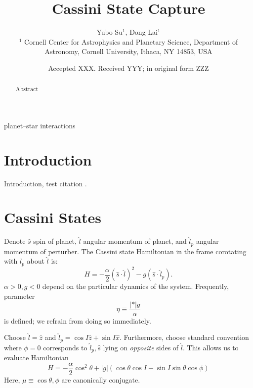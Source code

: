 \documentclass[
        fleqn,
        usenatbib,
    ]{mnras}
\title[Cassini State Capture]{Cassini State Capture}
\author[Y. Su et\ al.]{
Yubo Su$^1$,
Dong Lai$^1$
\\
$^1$ Cornell Center for Astrophysics and Planetary Science, Department of
Astronomy, Cornell University, Ithaca, NY 14853, USA
}
\date{Accepted XXX\@. Received YYY\@; in original form ZZZ}
\newcommand*{\abs}[1]{\left|#1\right|}
\newcommand*{\p}[1]{\left(#1\right)}
\begin{document}
\label{firstpage}
\pagerange{\pageref{firstpage}--\pageref{lastpage}}
\renewcommand*{\sectionautorefname}{Section}
\maketitle


\begin{abstract}
    Abstract
\end{abstract}

\begin{keywords}
planet--star interactions %
\end{keywords}

\section{Introduction}

Introduction, test citation \citep{henrard1982}.

\section{Cassini States}\label{s:cs}

Denote $\hat{s}$ spin of planet, $\hat{l}$ angular momentum of planet, and
$\hat{l}_p$ angular momentum of perturber. The Cassini state Hamiltonian in the
frame corotating with $\hat{l}_p$ about $\hat{l}$ is:
\begin{equation}
    H = -\frac{\alpha}{2}\p{\hat{s} \cdot \hat{l}}^2
        -g \p{\hat{s} \cdot \hat{l}_p}.
\end{equation}
$\alpha > 0, g < 0$ depend on the particular dynamics of the system. Frequently,
parameter
\begin{equation}
    \eta \equiv \frac{\abs*{g}}{\alpha} \label{eq:eta}
\end{equation}
is defined; we refrain from doing so immediately.

Choose $\hat{l} = \hat{z}$ and $\hat{l}_p = \cos I \hat{z} + \sin I \hat{x}$.
Furthermore, choose standard convention where $\phi = 0$ corresponds to
$\hat{l}_p, \hat{s}$ lying on \emph{opposite} sides of $\hat{l}$. This allows us
to evaluate Hamiltonian
\begin{equation}
    H = -\frac{\alpha}{2}\cos^2\theta
        + \abs{g} \p{\cos \theta \cos I - \sin I \sin \theta \cos \phi}
        \label{eq:H}
\end{equation}
Here, $\mu \equiv \cos \theta, \phi$ are canonically conjugate.
\end{document}
